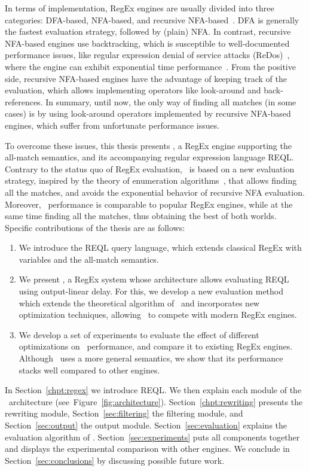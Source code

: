 In terms of implementation, RegEx engines are usually divided into three categories: DFA-based, NFA-based, and recursive NFA-based~\cite{cox2007regular}. DFA is generally the fastest evaluation strategy, followed by (plain) NFA. In contrast, recursive NFA-based engines use backtracking, which is susceptible to well-documented performance issues, like regular expression denial of service attacks (ReDos)~\cite{friedl2006mastering}, where the engine can exhibit exponential time performance~\cite{cox2007regular}. From the positive side, recursive NFA-based engines have the advantage of keeping track of the evaluation, which allows implementing operators like look-around and back-references.
In summary, until now, the only way of finding all matches (in some cases) is by using look-around operators implemented by recursive NFA-based engines, which suffer from unfortunate performance issues. 

To overcome these issues, this thesis presents \rematch, a RegEx engine supporting the all-match semantics, and its accompanying regular expression language REQL. Contrary to the status quo of RegEx evaluation, \rematch\ is based on a new evaluation strategy, inspired by the theory of enumeration algorithms~\cite{Segoufin13}, that allows finding all the matches, and avoids the exponential behavior of recursive NFA evaluation. Moreover, \rematch\ performance is comparable to popular RegEx engines, while at the same time finding all the matches, thus obtaining the best of both worlds. Specific contributions of the thesis are as follows:

\begin{enumerate}

\item  We introduce the REQL query language, which extends classical RegEx with variables and the all-match semantics.	

\item We present \rematch, a RegEx system whose architecture allows evaluating REQL using output-linear delay. For this, we develop a new evaluation method which extends the theoretical algorithm of~\cite{FlorenzanoRUVV20} and incorporates new optimization techniques, allowing \rematch\ to compete with modern RegEx engines. 

\item We develop a set of experiments to evaluate the effect of different optimizations on \rematch\ performance, and compare it to existing RegEx engines. Although \rematch\ uses a more general semantics, we show that its performance stacks well compared to other engines.
	
\end{enumerate}

In Section~\ref{chpt:regex} we introduce REQL. We then explain each module of the \rematch\ architecture (see~Figure~\ref{fig:architecture}). Section~\ref{chpt:rewriting} presents the rewriting module, Section~\ref{sec:filtering} the filtering module, and Section~\ref{sec:output} the output module. Section~\ref{sec:evaluation} explains the evaluation algorithm of \rematch. Section~\ref{sec:experiments} puts all components together and displays the experimental comparison with other engines. We conclude in Section~\ref{sec:conclusions} by discussing possible future work. 